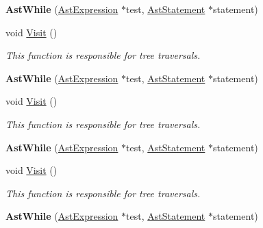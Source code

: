 \begin{DoxyCompactItemize}
\item 
\hypertarget{classAstWhile_a4c0e68b002b9425fba3f3e7b21a31e64}{{\bfseries Ast\-While} (\hyperlink{classAstExpression}{Ast\-Expression} $\ast$test, \hyperlink{classAstStatement}{Ast\-Statement} $\ast$statement)}\label{classAstWhile_a4c0e68b002b9425fba3f3e7b21a31e64}

\item 
void \hyperlink{classAstWhile_a9bf8eb5f0f63a4f0dc7b7201f292d4dd}{Visit} ()
\begin{DoxyCompactList}\small\item\em This function is responsible for tree traversals. \end{DoxyCompactList}\item 
\hypertarget{classAstWhile_a4c0e68b002b9425fba3f3e7b21a31e64}{{\bfseries Ast\-While} (\hyperlink{classAstExpression}{Ast\-Expression} $\ast$test, \hyperlink{classAstStatement}{Ast\-Statement} $\ast$statement)}\label{classAstWhile_a4c0e68b002b9425fba3f3e7b21a31e64}

\item 
void \hyperlink{classAstWhile_a9bf8eb5f0f63a4f0dc7b7201f292d4dd}{Visit} ()
\begin{DoxyCompactList}\small\item\em This function is responsible for tree traversals. \end{DoxyCompactList}\item 
\hypertarget{classAstWhile_a4c0e68b002b9425fba3f3e7b21a31e64}{{\bfseries Ast\-While} (\hyperlink{classAstExpression}{Ast\-Expression} $\ast$test, \hyperlink{classAstStatement}{Ast\-Statement} $\ast$statement)}\label{classAstWhile_a4c0e68b002b9425fba3f3e7b21a31e64}

\item 
void \hyperlink{classAstWhile_a9bf8eb5f0f63a4f0dc7b7201f292d4dd}{Visit} ()
\begin{DoxyCompactList}\small\item\em This function is responsible for tree traversals. \end{DoxyCompactList}\item 
\hypertarget{classAstWhile_a4c0e68b002b9425fba3f3e7b21a31e64}{{\bfseries Ast\-While} (\hyperlink{classAstExpression}{Ast\-Expression} $\ast$test, \hyperlink{classAstStatement}{Ast\-Statement} $\ast$statement)}\label{classAstWhile_a4c0e68b002b9425fba3f3e7b21a31e64}


\end{DoxyCompactItemize}
